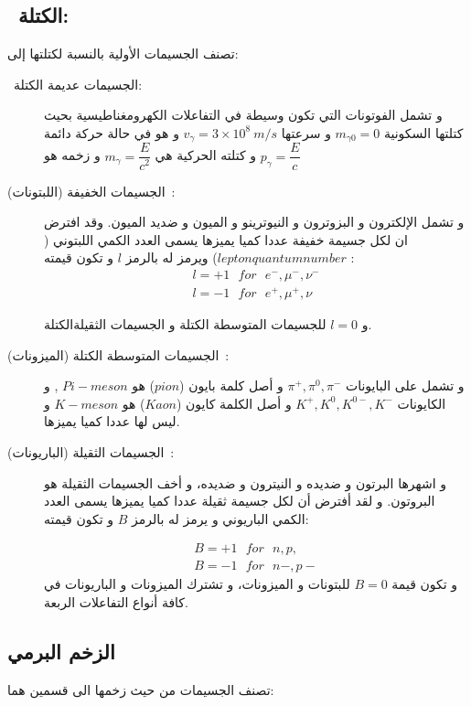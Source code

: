 \subsection{~الكتلة‬:}


تصنف الجسيمات اﻷولية بالنسبة لكتلتها إلى:
\begin{description}
	\item[~الجسيمات عديمة الكتلة:] و تشمل الفوتونات التي تكون وسيطة في التفاعلات الكهرومغناطيسية بحيث كتلتها السكونية 
	$m_{\gamma0 }=0$ و سرعتها
	$v_{\gamma } = 3\times 10^{8}~m/s$
	و هو في حالة حركة دائمة و كتلته الحركية هي 
	$m_{\gamma}=\dfrac{E}{c^{2}}$ 
	و زخمه هو 
	$p_{\gamma}= \dfrac{E}{c}$
	
	\item[الجسيمات الخفيفة (اللبتونات)~:]
	و تشمل الإلكترون و البزوترون و النيوترينو  و الميون و ضديد الميون. وقد افترض ان لكل جسيمة خفيفة عددا كميا يميزها يسمى العدد الكمي اللبتوني 
	($lepton quantum number$)
	ويرمز له بالرمز 
	$l$
و تكون قيمته :
\begin{gather*} 
	l = + 1 ~~~ for ~~~ e^{-} , \mu^{-} , \nu^{-}\\ 
	l = - 1 ~~~ for ~~~ e^{+} , \mu^{+} , \nu^{}
\end{gather*}

و 
$l=0$ للجسيمات المتوسطة الكتلة و الجسيمات الثقيلةالكتلة.

\item[الجسيمات المتوسطة الكتلة (الميزونات)~:]

و تشمل على البايونات
$\pi^{+}, \pi^{0}, \pi^{-}$
و أصل كلمة بايون
($pion$) هو $Pi-meson$ , 
و الكايونات 
$K^{+}, K^{0}, K^{0-}, K^{-}$
و أصل الكلمة كايون 
($Kaon$) هو 
$K-meson$
و ليس لها عددا كميا يميزها.
\item[الجسيمات الثقيلة (الباريونات)~:]
و اشهرها البرتون و ضديده و النيترون و ضديده، و أخف الجسيمات الثقيلة هو البروتون. و لقد أفترض أن لكل جسيمة ثقيلة عددا كميا يميزها يسمى العدد الكمي الباريوني و يرمز له بالرمز 
$B$ و تكون قيمته:

\begin{gather*} 
	B = + 1 ~~~ for ~~~ n , p , \\ 
	B = - 1 ~~~ for ~~~ n{-} , p{-} 
\end{gather*}
و تكون قيمة 
$B =0$
للبتونات و الميزونات، و تشترك الميزونات و الباريونات في كافة أنواع التفاعلات الربعة.

\end{description}

\subsection{الزخم البرمي}
تصنف الجسيمات من حيث زخمها الى قسمين هما:

